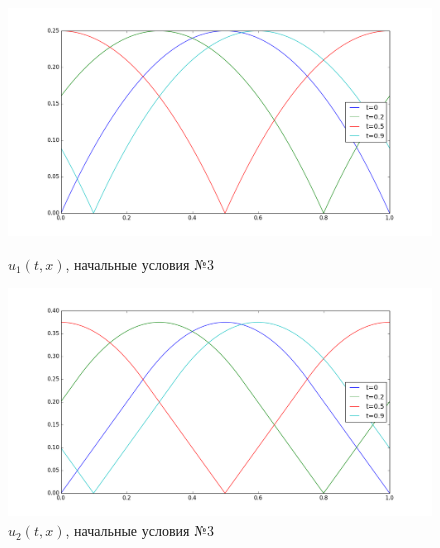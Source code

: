 \documentclass[titlepage]{article}
\begin{document}
\begin{figure}[h]
\begin{minipage}{.5\textwidth}
  \centering
  \includegraphics[width = \textwidth]{3_1.png}
  \caption{$u_1(t,x)$, начальные условия №3}
  \label{fig:test1}
\end{minipage}%
\begin{minipage}{.5\textwidth}
  \centering
  \includegraphics[width = \textwidth]{3_2.png}
  \caption{$u_2(t,x)$, начальные условия №3}
\end{minipage}
\end{figure}
\end{document}
